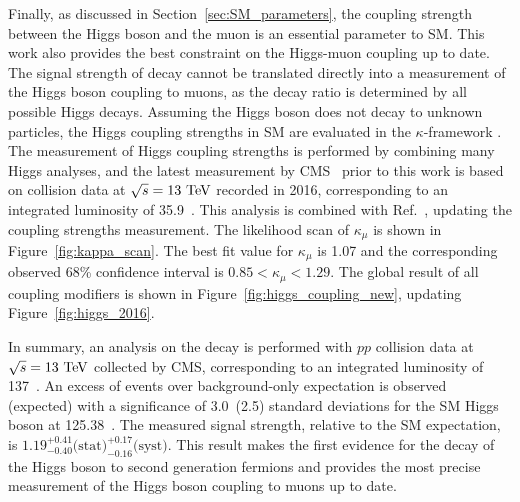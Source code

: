 Finally, as discussed in Section~\ref{sec:SM_parameters}, the coupling strength between the Higgs boson and the muon is an essential parameter to SM.
This work also provides the best constraint on the Higgs-muon coupling up to date.
The signal strength of \hmm decay cannot be translated directly into a measurement of the Higgs boson coupling to muons,
as the \hmm decay ratio is determined by all possible Higgs decays.
Assuming the Higgs boson does not decay to unknown particles, 
the Higgs coupling strengths in SM are evaluated in the $\kappa$-framework \cite{Heinemeyer:2013tqa}.
The measurement of Higgs coupling strengths is performed by combining many Higgs analyses,
and the latest measurement by CMS~\cite{Sirunyan:2640611} prior to this work is based on collision data at $\sqrt{s} = 13~\mbox{TeV}$ recorded in 2016, corresponding to an integrated luminosity of 35.9~\invfb.
This \hmm analysis is combined with Ref.~\cite{Sirunyan:2640611}, updating the coupling strengths measurement.
The likelihood scan of $\kappa_{\mu}$ is shown in Figure~\ref{fig:kappa_scan}.
The best fit value for $\kappa_{\mu}$ is 1.07 and the corresponding observed 68\% confidence interval is $0.85 < \kappa_{\mu} < 1.29$.
The global result of all coupling modifiers is shown in Figure~\ref{fig:higgs_coupling_new}, updating Figure~\ref{fig:higgs_2016}.

In summary, an analysis on the \hmm decay is performed with $pp$ collision data at $\sqrt{s} = 13~\mbox{TeV}$ collected by CMS, corresponding to an integrated luminosity of 137~\invfb.
An excess of events over background-only expectation is observed (expected) with a significance of 3.0~(2.5) standard deviations for the SM Higgs boson at 125.38~\GeV. 
The measured signal strength, relative to the SM expectation, is $1.19^{+0.41}_{-0.40} \text{(stat)}^{+0.17}_{-0.16} \text{(syst)}$.
This result makes the first evidence for the decay of the Higgs boson to second generation fermions and provides the most precise measurement of the Higgs boson coupling to muons up to date. 
